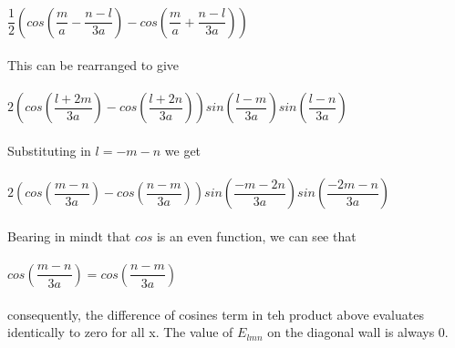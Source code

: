 \documentclass[prb,preprint]
{revtex4-1}
\begin{document}
\\
$\dfrac{1}{2}\left(cos\left(\dfrac{m}{a}-\dfrac{n-l}{3a}\right) - cos\left(\dfrac{m}{a}+\dfrac{n-l}{3a}\right)\right)$
\\
\\
This can be rearranged to give
\\
\\
$2\left(cos\left(\dfrac{l+2m}{3a}\right) - cos\left(\dfrac{l+2n}{3a}\right)\right)sin\left(\dfrac{l-m}{3a}\right)sin\left(\dfrac{l-n}{3a}\right)$
\\
\\
Substituting in $l = -m-n$ we get
\\
\\
$2\left(cos\left(\dfrac{m-n}{3a}\right) - cos\left(\dfrac{n-m}{3a}\right)\right)sin\left(\dfrac{-m-2n}{3a}\right)sin\left(\dfrac{-2m-n}{3a}\right)$
\\
\\
Bearing in mindt that $cos$ is an even function, we can see that
\\
\\
$cos\left(\dfrac{m-n}{3a}\right) = cos\left(\dfrac{n-m}{3a}\right)$
\\
\\
consequently, the difference of cosines term in teh product above evaluates identically to zero for all x.  The value of $E_{lmn}$ on the diagonal wall is always 0.
\\
\\



\end{document}
